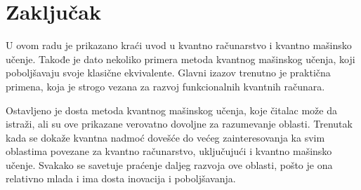 \documentclass[12pt, letterpaper, oneside]{article}
\begin{document}
\section{Zaključak}
U ovom radu je prikazano kraći uvod u kvantno računarstvo i kvantno mašinsko učenje. Takođe je dato nekoliko primera metoda kvantnog mašinskog učenja, 
koji poboljšavaju svoje klasične ekvivalente. Glavni izazov trenutno je praktična primena, koja je strogo vezana za razvoj funkcionalnih kvantnih računara.

Ostavljeno je dosta metoda kvantnog mašinskog učenja, koje čitalac može da istraži, ali su ove prikazane verovatno dovoljne za razumevanje oblasti.
Trenutak kada se dokaže kvantna nadmoć dovešće do većeg zainteresovanja ka svim oblastima povezane za kvantno računarstvo, 
uključujući i kvantno mašinsko učenje. Svakako se savetuje praćenje daljeg razvoja ove oblasti, pošto je ona relativno mlada
i ima dosta inovacija i poboljšavanja.


\newpage

\printbibliography
\end{document}
